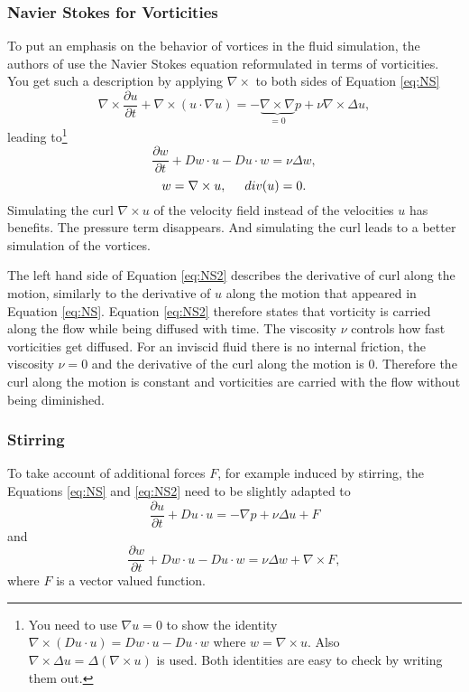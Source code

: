 \subsubsection{Navier Stokes for Vorticities}
To put an emphasis on the behavior of vortices in the fluid simulation, the authors of  use the Navier Stokes equation reformulated in terms of vorticities. You get such a description by applying $\nabla \times$ to both sides of Equation \ref{eq:NS}
\[\nabla \times \frac{\partial u}{ \partial{t}} + \nabla \times (u \cdot \nabla u) = - \underbrace{\nabla\times \nabla}_{=0} p + \nu \nabla \times \Delta u,\]
leading to\footnote{You need to use $\nabla u = 0$ to show the identity $\nabla \times (Du \cdot u) = D w \cdot u - Du \cdot w$ where $w = \nabla \times u$. Also $\nabla \times \Delta u = \Delta (\nabla \times u)$ is used. Both identities are easy to check by writing them out. }
\[\frac{\partial w}{\partial t} + Dw\cdot u - Du \cdot w =  \nu \Delta w,\]
\begin{equation}w = \nabla \times u,\hspace{0.5cm} div(u) = 0.\label{eq:NS2}\end{equation}
Simulating the curl $\nabla \times u$ of the velocity field instead of the velocities $u$ has benefits. The pressure term disappears. And simulating the curl leads to a better simulation of the vortices. 

The left hand side of Equation \ref{eq:NS2} describes the derivative of curl along the motion, similarly to the derivative of $u$ along the motion that appeared in Equation \ref{eq:NS}. Equation \ref{eq:NS2} therefore states that  vorticity is carried along the flow while being diffused with time. The viscosity $\nu$ controls how fast vorticities get diffused. For an inviscid fluid there is no internal friction,  the viscosity $\nu = 0$ and the derivative of the curl along the motion is 0. Therefore the curl along the motion is constant and vorticities are carried with the flow without being diminished.

\subsubsection{Stirring}
To take account of additional forces $F$, for example induced by stirring, the Equations \ref{eq:NS} and \ref{eq:NS2} need to be slightly adapted to
\[\frac{\partial u}{\partial t} + Du \cdot u = -\nabla p + \nu \Delta u + F\]
and
\begin{equation}\frac{\partial w}{\partial t} + Dw\cdot u - Du \cdot w =  \nu \Delta w + \nabla \times F \label{eq:NS3},\end{equation}
where $F$ is a vector valued function.

